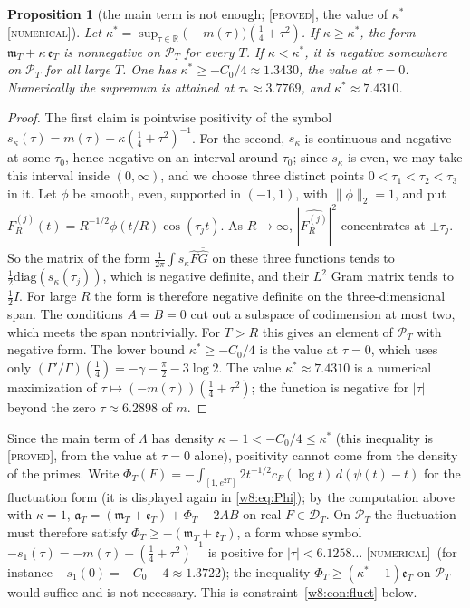 \documentclass[11pt]{amsart}
\newtheorem{proposition}[theorem]{Proposition}
\theoremstyle{definition}
\theoremstyle{remark}
\numberwithin{equation}{section}
\newcommand{\R}{\mathbb{R}}
\newcommand{\cF}{c_F}                                  %
\newcommand{\PT}{\mathcal{P}_T}                        %
\newcommand{\DT}{\mathcal{D}_T}                        %
\newcommand{\mT}{\mathfrak{m}_T}                       %
\newcommand{\aT}{\mathfrak{a}_T}                       %
\newcommand{\stag}[1]{\textsc{[#1]}}
\newcommand{\PROVED}{\stag{proved}}
\newcommand{\NUM}{\stag{numerical}}
\begin{document}
\begin{proposition}[the main term is not enough; \PROVED, the value of $\kappa^*$ \NUM]\label{w8:prop:kappa}
Let $\kappa^*=\sup_{\tau\in\R}\bigl(-m(\tau)\bigr)(\tfrac14+\tau^2)$. If $\kappa\ge\kappa^*$, the form
$\mT+\kappa\,\mathfrak e_T$ is nonnegative on $\PT$ for every $T$. If $\kappa<\kappa^*$, it is negative somewhere on
$\PT$ for all large $T$. One has $\kappa^*\ge-C_0/4\approx1.3430$, the value at $\tau=0$. Numerically the supremum
is attained at $\tau_*\approx3.7769$, and $\kappa^*\approx7.4310$.
\end{proposition}

\begin{proof}
The first claim is pointwise positivity of the symbol
$s_\kappa(\tau)=m(\tau)+\kappa(\frac14+\tau^2)^{-1}$. For the second, $s_\kappa$ is continuous and negative at some
$\tau_0$, hence negative on an interval around $\tau_0$; since $s_\kappa$ is even, we may take this interval inside
$(0,\infty)$, and we choose three distinct points $0<\tau_1<\tau_2<\tau_3$ in it. Let
$\phi$ be smooth, even, supported in $(-1,1)$, with $\|\phi\|_2=1$, and put
$F^{(j)}_R(t)=R^{-1/2}\phi(t/R)\cos(\tau_jt)$. As $R\to\infty$, $|\widehat{F^{(j)}_R}|^2$ concentrates at $\pm\tau_j$.
So the matrix of the form $\frac1{2\pi}\int s_\kappa\widehat F\overline{\widehat G}$ on these three functions tends to
$\frac12\mathrm{diag}(s_\kappa(\tau_j))$, which is negative definite, and their $L^2$ Gram matrix tends to
$\frac12 I$. For large $R$ the form is therefore negative definite on the three-dimensional span. The conditions
$A=B=0$ cut out a subspace of codimension at most two, which meets the span nontrivially. For $T>R$ this gives an
element of $\PT$ with negative form.
The lower bound $\kappa^*\ge-C_0/4$ is the value at $\tau=0$, which uses only
$(\Gamma'/\Gamma)(\frac14)=-\gamma-\frac\pi2-3\log2$. The value $\kappa^*\approx7.4310$ is a numerical maximization of
$\tau\mapsto(-m(\tau))(\frac14+\tau^2)$; the function is negative for $|\tau|$ beyond the zero $\tau\approx6.2898$ of $m$.
\end{proof}

Since the main term of $\Lambda$ has density $\kappa=1<-C_0/4\le\kappa^*$ (this inequality is \PROVED, from the value
at $\tau=0$ alone), positivity cannot come from the density of the primes.
Write $\Phi_T(F)=-\int_{[1,e^{2T}]}2t^{-1/2}\cF(\log t)\,d(\psi(t)-t)$ for the fluctuation form (it is displayed again in \eqref{w8:eq:Phi}); by the computation above with $\kappa=1$, $\aT=(\mT+\mathfrak e_T)+\Phi_T-2AB$ on real $F\in\DT$.
On $\PT$ the fluctuation must therefore satisfy $\Phi_T\ge-(\mT+\mathfrak e_T)$, a form whose symbol $-s_1(\tau)=-m(\tau)-(\frac14+\tau^2)^{-1}$ is positive for $|\tau|<6.1258\ldots$ \NUM\ (for instance $-s_1(0)=-C_0-4\approx1.3722$); the inequality $\Phi_T\ge(\kappa^*-1)\mathfrak e_T$ on $\PT$ would suffice and is not necessary. This is
constraint~\ref{w8:con:fluct} below.
\end{document}

